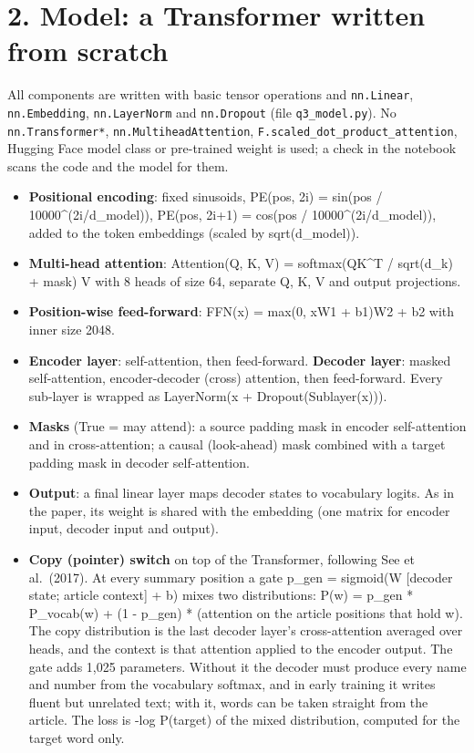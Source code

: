 \documentclass[10pt,a4paper]{article}
\providecommand{\tightlist}{\setlength{\itemsep}{0pt}\setlength{\parskip}{0pt}}
\begin{document}
\hypertarget{model-a-transformer-written-from-scratch}{%
\section{2. Model: a Transformer written from scratch}\label{model-a-transformer-written-from-scratch}}

All components are written with basic tensor operations and \texttt{nn.Linear}, \texttt{nn.Embedding}, \texttt{nn.LayerNorm} and \texttt{nn.Dropout} (file \texttt{q3\_model.py}). No \texttt{nn.Transformer*}, \texttt{nn.MultiheadAttention}, \texttt{F.scaled\_dot\_product\_attention}, Hugging Face model class or pre-trained weight is used; a check in the notebook scans the code and the model for them.

\begin{itemize}
\tightlist
\item
  \textbf{Positional encoding}: fixed sinusoids, PE(pos, 2i) = sin(pos / 10000\^{}(2i/d\_model)), PE(pos, 2i+1) = cos(pos / 10000\^{}(2i/d\_model)), added to the token embeddings (scaled by sqrt(d\_model)).
\item
  \textbf{Multi-head attention}: Attention(Q, K, V) = softmax(QK\^{}T / sqrt(d\_k) + mask) V with 8 heads of size 64, separate Q, K, V and output projections.
\item
  \textbf{Position-wise feed-forward}: FFN(x) = max(0, xW1 + b1)W2 + b2 with inner size 2048.
\item
  \textbf{Encoder layer}: self-attention, then feed-forward. \textbf{Decoder layer}: masked self-attention, encoder-decoder (cross) attention, then feed-forward. Every sub-layer is wrapped as LayerNorm(x + Dropout(Sublayer(x))).
\item
  \textbf{Masks} (True = may attend): a source padding mask in encoder self-attention and in cross-attention; a causal (look-ahead) mask combined with a target padding mask in decoder self-attention.
\item
  \textbf{Output}: a final linear layer maps decoder states to vocabulary logits. As in the paper, its weight is shared with the embedding (one matrix for encoder input, decoder input and output).
\item
  \textbf{Copy (pointer) switch} on top of the Transformer, following See et al.~(2017). At every summary position a gate p\_gen = sigmoid(W {[}decoder state; article context{]} + b) mixes two distributions: P(w) = p\_gen * P\_vocab(w) + (1 - p\_gen) * (attention on the article positions that hold w). The copy distribution is the last decoder layer's cross-attention averaged over heads, and the context is that attention applied to the encoder output. The gate adds 1,025 parameters. Without it the decoder must produce every name and number from the vocabulary softmax, and in early training it writes fluent but unrelated text; with it, words can be taken straight from the article. The loss is -log P(target) of the mixed distribution, computed for the target word only.
\end{itemize}
\end{document}
